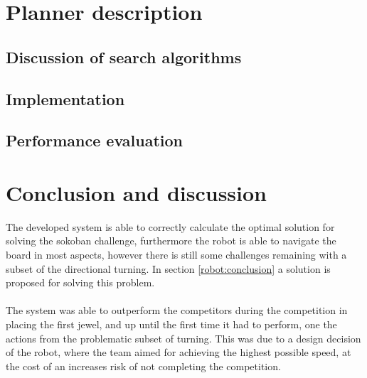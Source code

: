\documentclass[final, english, a4paper]{article}
\begin{document}
\section{Planner description}
    
	\subsection{Discussion of search algorithms} %
		
	\subsection{Implementation}
	
	\subsection{Performance evaluation}
	
\section{Conclusion and discussion}    
    The developed system is able to correctly calculate the optimal solution for solving
    the sokoban challenge, furthermore the robot is able to navigate the board in most
    aspects, however there is still some challenges remaining with a subset of the directional turning.
    In section \ref{robot:conclusion} a solution is proposed for solving this problem.\\
    \\
    The system was able to outperform the competitors during the competition in
    placing the first jewel, and up until the first time it had to perform,
    one the actions from the problematic subset of turning.
    This was due to a design decision of the robot, where the team aimed for 
    achieving the highest possible speed, at the cost of an increases risk of
    not completing the competition.
    \\\\
%
%
\end{document}
